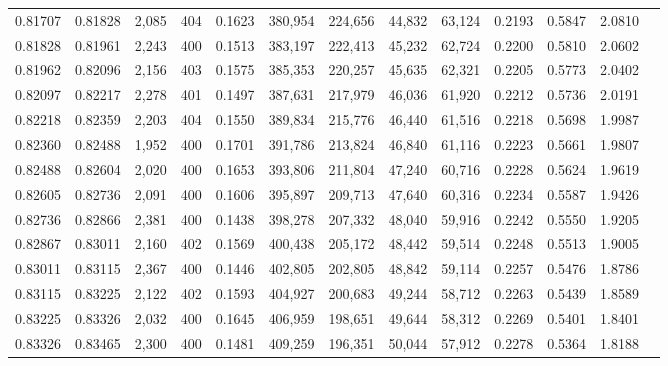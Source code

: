 \begin{tabular}{rrrrrrrrrrrrr}
0.81707 & 0.81828 & 2,085 & 404 &                                     0.1623 & 380,954 & 224,656 &  44,832 &  63,124 & 0.2193 & 0.5847 & 2.0810 \\
0.81828 & 0.81961 & 2,243 & 400 &                                     0.1513 & 383,197 & 222,413 &  45,232 &  62,724 & 0.2200 & 0.5810 & 2.0602 \\
0.81962 & 0.82096 & 2,156 & 403 &                                     0.1575 & 385,353 & 220,257 &  45,635 &  62,321 & 0.2205 & 0.5773 & 2.0402 \\
0.82097 & 0.82217 & 2,278 & 401 &                                     0.1497 & 387,631 & 217,979 &  46,036 &  61,920 & 0.2212 & 0.5736 & 2.0191 \\
0.82218 & 0.82359 & 2,203 & 404 &                                     0.1550 & 389,834 & 215,776 &  46,440 &  61,516 & 0.2218 & 0.5698 & 1.9987 \\
0.82360 & 0.82488 & 1,952 & 400 &                                     0.1701 & 391,786 & 213,824 &  46,840 &  61,116 & 0.2223 & 0.5661 & 1.9807 \\
0.82488 & 0.82604 & 2,020 & 400 &                                     0.1653 & 393,806 & 211,804 &  47,240 &  60,716 & 0.2228 & 0.5624 & 1.9619 \\
0.82605 & 0.82736 & 2,091 & 400 &                                     0.1606 & 395,897 & 209,713 &  47,640 &  60,316 & 0.2234 & 0.5587 & 1.9426 \\
0.82736 & 0.82866 & 2,381 & 400 &                                     0.1438 & 398,278 & 207,332 &  48,040 &  59,916 & 0.2242 & 0.5550 & 1.9205 \\
0.82867 & 0.83011 & 2,160 & 402 &                                     0.1569 & 400,438 & 205,172 &  48,442 &  59,514 & 0.2248 & 0.5513 & 1.9005 \\
0.83011 & 0.83115 & 2,367 & 400 &                                     0.1446 & 402,805 & 202,805 &  48,842 &  59,114 & 0.2257 & 0.5476 & 1.8786 \\
0.83115 & 0.83225 & 2,122 & 402 &                                     0.1593 & 404,927 & 200,683 &  49,244 &  58,712 & 0.2263 & 0.5439 & 1.8589 \\
0.83225 & 0.83326 & 2,032 & 400 &                                     0.1645 & 406,959 & 198,651 &  49,644 &  58,312 & 0.2269 & 0.5401 & 1.8401 \\
0.83326 & 0.83465 & 2,300 & 400 &                                     0.1481 & 409,259 & 196,351 &  50,044 &  57,912 & 0.2278 & 0.5364 & 1.8188 \\

\end{tabular}
